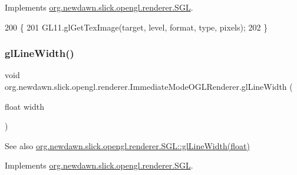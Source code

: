 Implements \mbox{\hyperlink{interfaceorg_1_1newdawn_1_1slick_1_1opengl_1_1renderer_1_1_s_g_l_a2df0054d4c79f4f9d854a7b55975ecc0}{org.\+newdawn.\+slick.\+opengl.\+renderer.\+S\+GL}}.


\begin{DoxyCode}
200                                                                                               \{
201         GL11.glGetTexImage(target, level, format, type, pixels);
202     \}
\end{DoxyCode}
\mbox{\label{classorg_1_1newdawn_1_1slick_1_1opengl_1_1renderer_1_1_immediate_mode_o_g_l_renderer_a31bc611222a137427b8795f830af7eb7}} 
\subsubsection{\texorpdfstring{gl\+Line\+Width()}{glLineWidth()}}
{\footnotesize\ttfamily void org.\+newdawn.\+slick.\+opengl.\+renderer.\+Immediate\+Mode\+O\+G\+L\+Renderer.\+gl\+Line\+Width (\begin{DoxyParamCaption}\item[{float}]{width }\end{DoxyParamCaption})\hspace{0.3cm}{\ttfamily [inline]}}

\begin{DoxySeeAlso}{See also}
\mbox{\hyperlink{interfaceorg_1_1newdawn_1_1slick_1_1opengl_1_1renderer_1_1_s_g_l_a6c064bfcda5e00a6b94f15f0c3b448f4}{org.\+newdawn.\+slick.\+opengl.\+renderer.\+S\+G\+L\+::gl\+Line\+Width(float)}} 
\end{DoxySeeAlso}


Implements \mbox{\hyperlink{interfaceorg_1_1newdawn_1_1slick_1_1opengl_1_1renderer_1_1_s_g_l_a6c064bfcda5e00a6b94f15f0c3b448f4}{org.\+newdawn.\+slick.\+opengl.\+renderer.\+S\+GL}}.


